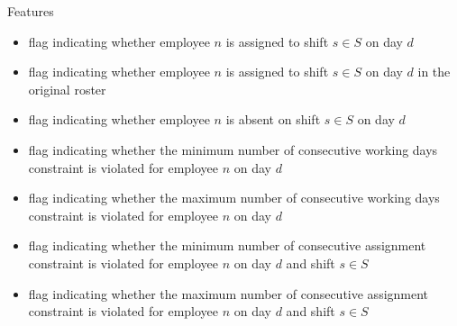\documentclass[aspectratio=1610]{beamer}
\renewcommand{\footnotesize}{\scriptsize}
\begin{document}
\begin{frame}{Features }
	\footnotesize
	\begin{itemize}
		\item flag indicating whether employee $n$ is assigned to shift $s \in S$ on day $d$  
		\item flag indicating whether employee $n$ is assigned to shift $s \in S$ on day $d$ in the original roster 
		\item flag indicating whether employee $n$ is absent on shift $s \in S$ on day $d$  
		\item flag indicating whether the minimum number of consecutive working days constraint is violated for employee $n$ on day $d$
		\item flag indicating whether the maximum number of consecutive working days constraint is violated for employee $n$ on day $d$  
		\item flag indicating whether the minimum number of consecutive assignment constraint is violated for employee $n$ on day $d$ and shift $s \in S$  
		\item flag indicating whether the maximum number of consecutive assignment constraint is violated for employee $n$ on day $d$ and shift $s \in S$  
	\end{itemize}
\end{frame}
\end{document}

